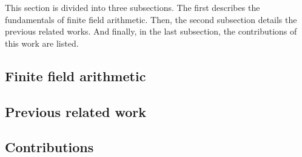 This section is divided into three subsections. The first describes the fundamentals of finite field arithmetic. 
Then, the second subsection details the previous related works. And finally, in the last subsection, 
the contributions of this work are listed.

\subsection{Finite field arithmetic}

\subsection{Previous related work}

\subsection{Contributions}